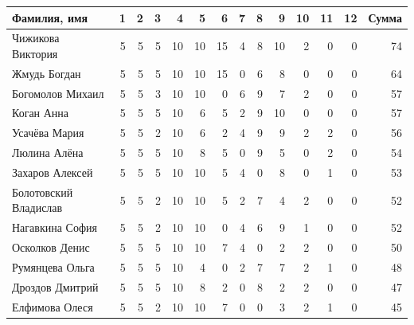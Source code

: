 \documentclass[12pt]{article}
\newlength{\h}
\begin{document}
\begin{small}
\begin{center}
\begin{tabular}{lrrrrrrrrrrrrr}
  \hline
  Фамилия, имя           &    1  &  2  &    3  &   4  &    5  &    6  &    7  &    8  &    9  &   10  &    11  &    12  &  Сумма  \\
  \hline
  Чижикова Виктория      &    5  &  5  &    5  &  10  &   10  &   15  &    4  &    8  &   10  &    2  &     0  &     0  &     74  \\
  Жмудь Богдан           &    5  &  5  &    5  &  10  &   10  &   15  &    0  &    6  &    8  &    0  &     0  &     0  &     64  \\
  Богомолов Михаил       &    5  &  5  &    3  &  10  &   10  &    0  &    6  &    9  &    7  &    2  &     0  &     0  &     57  \\
  Коган Анна             &    5  &  5  &    5  &  10  &    6  &    5  &    2  &    9  &   10  &    0  &     0  &     0  &     57  \\
  Усачёва Мария          &    5  &  5  &    2  &  10  &    6  &    2  &    4  &    9  &    9  &    2  &     2  &     0  &     56  \\
  Люлина Алёна           &    5  &  5  &    5  &  10  &    8  &    5  &    0  &    9  &    5  &    0  &     2  &     0  &     54  \\
  Захаров Алексей        &    5  &  5  &    5  &  10  &   10  &    5  &    4  &    0  &    8  &    0  &     1  &     0  &     53  \\
  Болотовский Владислав  &    5  &  5  &    2  &  10  &   10  &    5  &    2  &    7  &    4  &    2  &     0  &     0  &     52  \\
  Нагавкина София        &    5  &  5  &    2  &  10  &   10  &    0  &    4  &    6  &    9  &    1  &     0  &     0  &     52  \\
  Осколков Денис         &    5  &  5  &    5  &  10  &   10  &    7  &    4  &    0  &    2  &    2  &     0  &     0  &     50  \\
  Румянцева Ольга        &    5  &  5  &    5  &  10  &    4  &    0  &    2  &    7  &    7  &    2  &     1  &     0  &     48  \\
  Дроздов Дмитрий        &    5  &  5  &    5  &  10  &    8  &    2  &    0  &    8  &    2  &    2  &     0  &     0  &     47  \\
  Елфимова Олеся         &    5  &  5  &    2  &  10  &   10  &    7  &    0  &    0  &    3  &    2  &     1  &     0  &     45  \\

\end{tabular}
\end{center}
\end{small}
\end{document}
